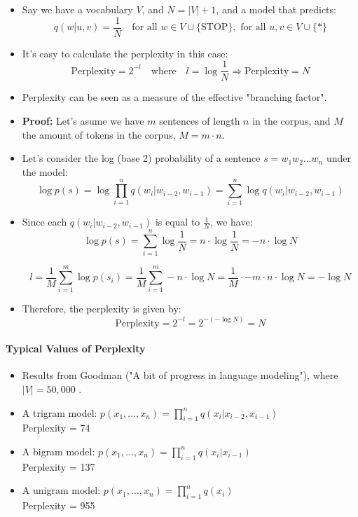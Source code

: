 \documentclass{book}
\begin{document}
    \begin{itemize}
        \item Say we have a vocabulary $V$, and $N = |V| + 1$, and a model that predicts:
        \[
            q(w|u, v) = \frac{1}{N} \quad \text{for all } w \in V \cup \{\text{STOP}\}, \text{ for all } u, v \in V \cup \{*\}
        \]
        \item It's easy to calculate the perplexity in this case:
        \[
            \text{Perplexity} = 2^{-l} \quad \text{where} \quad l = \log \frac{1}{N} \Rightarrow \text{Perplexity} = N
        \]
        \item Perplexity can be seen as a measure of the effective "branching factor".       
        
        \item \textbf{Proof:}  Let's asume we have $m$ sentences of length $n$ in the corpus, and $M$ the amount of tokens in the corpus, $M=m \cdot n$.
        
        \item Let's consider the log (base 2) probability of a sentence $s = w_1 w_2 \dots w_n$ under the model:
        \[
            \log p(s) = \log \prod_{i=1}^{n} q(w_i|w_{i-2}, w_{i-1}) = \sum_{i=1}^{n} \log q(w_i|w_{i-2}, w_{i-1})
        \]
        \item Since each $q(w_i|w_{i-2}, w_{i-1})$ is equal to $\frac{1}{N}$, we have:
        \[
            \log p(s) = \sum_{i=1}^{n} \log \frac{1}{N} = n \cdot \log \frac{1}{N} = -n \cdot \log N
        \]
        
        
        \[
            l =  \frac{1}{M} \sum_{i=1}^{m} \log p(s_i) = \frac{1}{M} \sum_{i=1}^{m} -n \cdot \log N  = \frac{1}{M} \cdot -m \cdot n \cdot \log N = - \log N 
        \]
        
                
        \item Therefore, the perplexity is given by:
        \[
            \text{Perplexity} = 2^{-l} = 2^{-(- \log N)} = N
        \]
    \end{itemize}


\paragraph{Typical Values of Perplexity}
    \begin{itemize}
        \item Results from Goodman ("A bit of progress in language modeling"), where $|V| = 50,000$ \cite{goodman2001bit}.
        \item A trigram model: $p(x_1, \ldots, x_n) = \prod_{i=1}^n q(x_i | x_{i-2}, x_{i-1})$ \\
        Perplexity = 74
        \item A bigram model: $p(x_1, \ldots, x_n) = \prod_{i=1}^n q(x_i | x_{i-1})$ \\
        Perplexity = 137
        \item A unigram model: $p(x_1, \ldots, x_n) = \prod_{i=1}^n q(x_i)$ \\
        Perplexity = 955
    \end{itemize}
\end{document}
